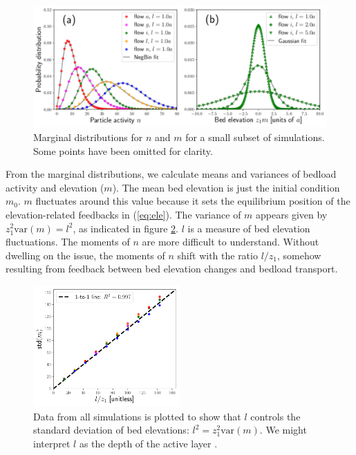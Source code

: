 \documentclass[draft]{agujournal2018}
\begin{document}
\begin{figure}[t!]
	\includegraphics[width=\linewidth,keepaspectratio]{./figures/montage2.pdf}
	\caption{Marginal distributions for $n$ and $m$ for a small subset of simulations. Some points have been omitted for clarity.}
	\label{fig:pdfs}
\end{figure}

From the marginal distributions, we calculate means and variances of bedload activity and elevation ($m$).
The mean bed elevation is just the initial condition $m_0$. $m$ fluctuates around this value because it sets the equilibrium position of the elevation-related feedbacks in (\ref{eq:ele}).
The variance of $m$ appears given by $z_1^2 \text{var}(m) = l^2$, as indicated in figure \ref{fig:var}.
$l$ is a measure of bed elevation fluctuations.
The moments of $n$ are more difficult to understand.
Without dwelling on the issue, the moments of $n$ shift with the ratio $l/z_1$, somehow resulting from feedback between bed elevation changes and bedload transport.

\begin{figure}
	\centering
	\includegraphics[width=0.5\textwidth,keepaspectratio]{./figures/variance.pdf}
	\caption{Data from all simulations is plotted to show that $l$ controls the standard deviation of bed elevations: $l^2 = z_1^2\text{var}(m).$ We might interpret $l$ as the depth of the active layer \citep[e.g.][]{Church2017}.}
	\label{fig:var}
\end{figure}
\end{document}
